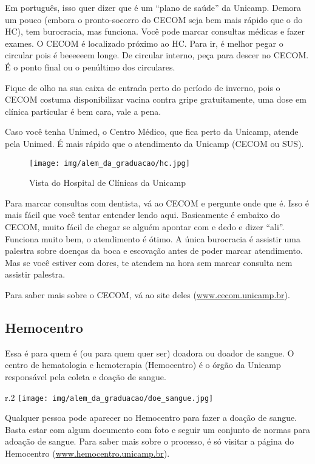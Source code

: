 Em português, isso quer dizer que é um ``plano de saúde'' da Unicamp. Demora um
pouco (embora o pronto-socorro do CECOM seja bem mais rápido que o do HC), tem
burocracia, mas funciona. Você pode marcar consultas médicas e fazer exames. O
CECOM é localizado próximo ao HC. Para ir, é melhor pegar o circular pois é
beeeeeem longe. De circular interno, peça para descer no CECOM. É o ponto final
ou o penúltimo dos circulares.

Fique de olho na sua caixa de entrada perto do período de inverno, pois o CECOM
costuma disponibilizar vacina contra gripe gratuitamente, uma dose em clínica
particular é bem cara, vale a pena.

Caso você tenha Unimed, o Centro Médico, que fica perto da Unicamp, atende pela
Unimed. É mais rápido que o atendimento da Unicamp (CECOM ou SUS).

\begin{figure}[h!]
  \centering
  \texttt{[image: img/alem\_da\_graduacao/hc.jpg]}
  \caption*{Vista do Hospital de Clínicas da Unicamp}
\end{figure}

Para marcar consultas com dentista, vá ao CECOM e pergunte onde que é. Isso é
mais fácil que você tentar entender lendo aqui. Basicamente é embaixo do CECOM,
muito fácil de chegar se alguém apontar com e dedo e dizer ``ali''. Funciona
muito bem, o atendimento é ótimo. A única burocracia é assistir uma palestra
sobre doenças da boca e escovação antes de poder marcar atendimento. Mas se
você estiver com dores, te atendem na hora sem marcar consulta nem assistir
palestra.

Para saber mais sobre o CECOM, vá ao site deles (\url{www.cecom.unicamp.br}).

\subsection{Hemocentro}

Essa é para quem é (ou para quem quer ser) doadora ou doador de sangue. O
centro de hematologia e hemoterapia (Hemocentro) é o órgão da Unicamp
responsável pela coleta e doação de sangue.

\begin{wrapfigure}{r}{.2\textwidth}
  \centering
  \texttt{[image: img/alem\_da\_graduacao/doe\_sangue.jpg]}
\end{wrapfigure}

Qualquer pessoa pode aparecer no Hemocentro para fazer a doação de sangue.
Basta estar com algum documento com foto e seguir um conjunto de normas para
adoação de sangue. Para saber mais sobre o processo, é só visitar a página do
Hemocentro (\url{www.hemocentro.unicamp.br}).

